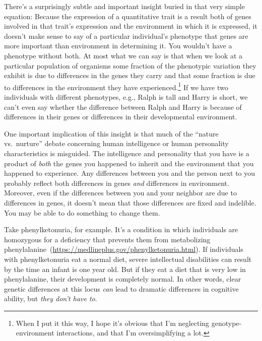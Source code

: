 \documentclass[12pt]{article}
\begin{document}
There's a surprisingly subtle and important insight buried in that
very simple equation: Because the expression of a quantitative trait
is a result both of genes involved in that trait's expression and the
environment in which it is expressed, it doesn't make sense to say of
a particular individual's phenotype that genes are more important than
environment in determining it. You wouldn't have a phenotype without
both. At most what we can say is that when we look at a particular
population of organisms some fraction of the phenotypic variation they
exhibit is due to differences in the genes they carry and that some
fraction is due to differences in the environment they have
experienced.\footnote{When I put it this way, I hope it's obvious that
  I'm neglecting genotype-environment interactions, and that I'm
  oversimplifying a lot.} If we have two
individuals with different phenotypes, e.g., Ralph is tall and Harry
is short, we can't even say whether the difference between Ralph and
Harry is because of differences in their genes or differences in their
developmental environment.

One important implication of this insight is that much of the ``nature
vs.\ nurture'' debate concerning human intelligence or human
personality characteristics is misguided. The intelligence and
personality that you have is a product of {\it both} the genes you
happened to inherit and the environment that you happened to
experience. Any differences between you and the person next to you
probably reflect both differences in genes {\it and\/} differences in
environment. Moreover, even if the differences between you and your
neighbor are due to differences in genes, it doesn't mean that those
differences are fixed and indelible. You may be able to do something
to change them.

Take phenylketonuria, for example. It's a condition in which
individuals are homozygous for a deficiency that prevents them from
metabolizing
phenylalanine~(\url{https://medlineplus.gov/phenylketonuria.html}).
If individuals with phenylketonuria eat a normal diet, severe
intellectual disabilities can result by the time an infant is one year
old. But if they eat a diet that is very low in phenylalanine, their
development is completely normal. In other
words, clear genetic differences at this locus {\it can\/} lead to
dramatic differences in cognitive ability, but {\it they don't have
  to}.
\end{document}
